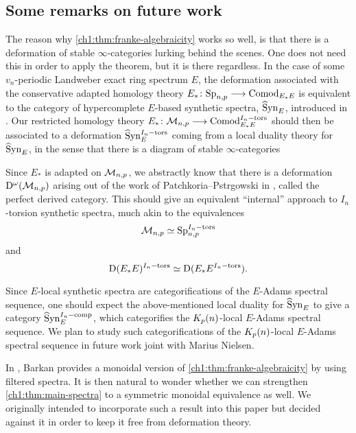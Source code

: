 



\subsection*{Some remarks on future work}

The reason why \cref{ch1:thm:franke-algebraicity} works so well, is that there is a deformation of stable $\infty$-categories lurking behind the scenes. One does not need this in order to apply the theorem, but it is there regardless. In the case of some $v_n$-periodic Landweber exact ring spectrum $E$, the deformation associated with the conservative adapted homology theory $E_*\colon \mathrm{Sp}_{n,p} \longrightarrow \mathrm{Comod}_{E_*E}$ is equivalent to the category of hypercomplete $E$-based synthetic spectra, $\widehat{\mathrm{S}}\mathrm{yn}_{E}$, introduced in \cite{pstragowski_2022}. Our restricted homology theory $E_*\colon \mathcal{M}_{n,p}\longrightarrow \mathrm{Comod}_{E_*E}^{I_n-\mathrm{tors}}$ should then be associated to a deformation $\widehat{\mathrm{S}}\mathrm{yn}_{E}^{I_n-\mathrm{tors}}$ coming from a local duality theory for $\widehat{\mathrm{S}}\mathrm{yn}_{E}$, in the sense that there is a diagram of stable $\infty$-categories 
\begin{center}
\end{center}
Since $E_*$ is adapted on $\mathcal{M}_{n,p}$, we abstractly know that there is a deformation $\mathrm{D}^\omega(\mathcal{M}_{n,p})$ arising out of the work of Patchkoria--Pstr\a{}gowski in \cite{patchkoria-pstragowski_2021}, called the perfect derived category. This should give an equivalent ``internal'' approach to $I_n$-torsion synthetic spectra, much akin to the equivalences 
\[\mathcal{M}_{n,p}\simeq \mathrm{Sp}_{n,p}^{I_n-\mathrm{tors}}\] 
and 
\[\mathrm{D}(E_*E)^{I_n-\mathrm{tors}}\simeq \mathrm{D}(E_*E^{I_n-\mathrm{tors}}).\]

Since $E$-local synthetic spectra are categorifications of the $E$-Adams spectral sequence, one should expect the above-mentioned local duality for $\widehat{\mathrm{S}}\mathrm{yn}_{E}$ to give a category $\widehat{\mathrm{S}}\mathrm{yn}_{E}^{I_n-\mathrm{comp}}$, which categorifies the ${K_p(n)}$-local $E$-Adams spectral sequence. We plan to study such categorifications of the ${K_p(n)}$-local $E$-Adams spectral sequence in future work joint with Marius Nielsen.

In \cite{barkan_2023}, Barkan provides a monoidal version of \cref{ch1:thm:franke-algebraicity} by using filtered spectra. It is then natural to wonder whether we can strengthen \cref{ch1:thm:main-spectra} to a symmetric monoidal equivalence as well. We originally intended to incorporate such a result into this paper but decided against it in order to keep it free from deformation theory. 

